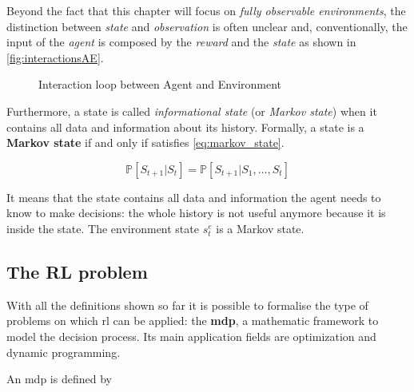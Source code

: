 Beyond the fact that this chapter will focus on \textit{fully observable environments}, the distinction between \textit{state} and \textit{observation} is often unclear and, conventionally, the input of the \textit{agent} is composed by the \textit{reward} and the \textit{state} as shown in \vref{fig:interactionsAE}.

\begin{figure}
	\centering
	\caption[Interaction loop between Agent and Environment]{Interaction loop between Agent and Environment}
	\label{fig:interactionsAE}
\end{figure}


Furthermore, a state is called \textit{informational state} (or \textit{Markov state}) when it contains all data and information about its history. Formally, a state is a \textbf{Markov state} if and only if satisfies \vref{eq:markov_state}.

\begin{equation} \label{eq:markov_state}
	\mathbb{P}[S_{t+1}| S_t] = \mathbb{P}[S_{t+1} | S_1, \dots, S_t]
\end{equation}

 It means that the state contains all data and information the agent needs to know to make decisions: the whole history is not useful anymore because it is inside the state. The environment state $s_t^e$ is a Markov state.
 
 \subsection{The RL problem}
 With all the definitions shown so far it is possible to formalise the type of problems on which \gls{rl} can be applied: the \textbf{\gls{mdp}}, a mathematic framework to model the decision process. Its main application fields are optimization and dynamic programming.
 
 An \gls{mdp} is defined by 

